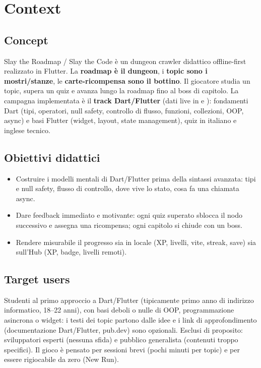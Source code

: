 \chapter{Context}
\label{g:context}

\section{Concept}
Slay the Roadmap / Slay the Code \`e un dungeon crawler didattico
offline-first realizzato in Flutter. La \textbf{roadmap \`e il dungeon},
i \textbf{topic sono i mostri/stanze}, le \textbf{carte-ricompensa sono il
bottino}. Il giocatore studia un topic, supera un quiz e avanza lungo la
roadmap fino al boss di capitolo. La campagna implementata \`e il
\textbf{track Dart/Flutter} (dati live in
 e
): fondamenti Dart (tipi,
operatori, null safety, controllo di flusso, funzioni, collezioni, OOP,
async) e basi Flutter (widget, layout, state management), quiz in italiano e
inglese tecnico.

\section{Obiettivi didattici}
\begin{itemize}
\item Costruire i modelli mentali di Dart/Flutter prima della
sintassi avanzata: tipi e null safety, flusso di controllo, dove vive
lo stato, cosa fa una chiamata async.
\item Dare feedback immediato e motivante: ogni quiz superato sblocca il nodo
successivo e assegna una ricompensa; ogni capitolo si chiude con un boss.
\item Rendere misurabile il progresso sia in locale (XP, livelli, vite,
streak, save) sia sull'Hub (XP, badge, livelli remoti).
\end{itemize}

\section{Target users}
Studenti al primo approccio a Dart/Flutter (tipicamente primo anno
di indirizzo informatico, 18--22 anni), con basi deboli o nulle di
OOP, programmazione asincrona o widget: i testi dei topic partono dalle
idee e i link di approfondimento (documentazione Dart/Flutter,
pub.dev) sono opzionali. Esclusi di proposito: sviluppatori esperti (nessuna sfida) e
pubblico generalista (contenuti troppo specifici). Il gioco \`e pensato
per sessioni brevi (pochi minuti per topic) e per essere rigiocabile da
zero (New Run).

